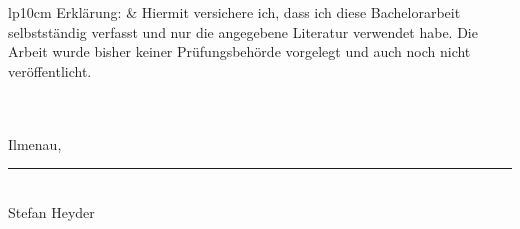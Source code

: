 \documentclass[a4paper,11pt]{article}
\begin{document}
\newpage
\thispagestyle{empty}
\vspace*{15cm}
\begin{tabular}{lp{10cm}}
{Erklärung:} & {Hiermit versichere ich, dass ich diese Bachelorarbeit selbstständig verfasst und nur die angegebene Literatur verwendet habe. Die Arbeit wurde bisher keiner Prüfungsbehörde vorgelegt und auch noch nicht veröffentlicht.} \\
\\\\
{Ilmenau, \datum \hspace{3.2cm} \rule{4cm}{0.4pt}}\\
{\hspace{8.9cm} Stefan Heyder} \\
\end{tabular}
\end{document}
